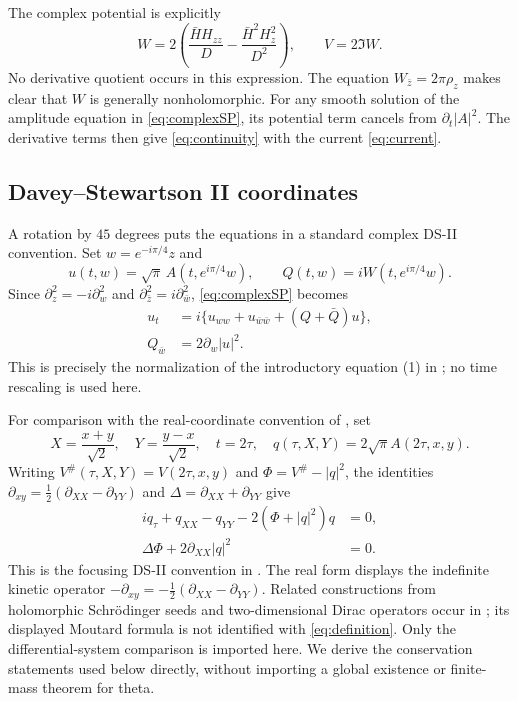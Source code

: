 \documentclass[11pt]{article}
\theoremstyle{definition}
\theoremstyle{remark}
\begin{document}
The complex potential is explicitly
\begin{equation}
 W=2\left(\frac{\bar H H_{zz}}D
             -\frac{\bar H^2H_z^2}{D^2}\right),\qquad
 V=2\Im W.
 \label{eq:explicitV}
\end{equation}
No derivative quotient occurs in this expression. The equation
$W_{\bar z}=2\pi\rho_z$ makes clear that $W$ is generally
nonholomorphic. For any smooth solution of the amplitude equation in
\eqref{eq:complexSP}, its potential term cancels from
$\partial_t|A|^2$. The derivative terms then give
\eqref{eq:continuity} with the current \eqref{eq:current}.

\subsection{Davey--Stewartson II coordinates}

A rotation by $45$ degrees puts the equations in a standard complex
DS-II convention. Set $w=e^{-i\pi/4}z$ and
\[
 u(t,w)=\sqrt\pi\,A(t,e^{i\pi/4}w),\qquad
 Q(t,w)=iW(t,e^{i\pi/4}w).
\]
Since $\partial_z^2=-i\partial_w^2$ and
$\partial_{\bar z}^2=i\partial_{\bar w}^2$,
\eqref{eq:complexSP} becomes
\begin{equation}
 \begin{aligned}
 u_t&=i\{u_{ww}+u_{\bar w\bar w}+(Q+\bar Q)u\},\\
 Q_{\bar w}&=2\partial_w|u|^2.
 \end{aligned}
 \label{eq:complexDSII}
\end{equation}
This is precisely the normalization of the introductory equation (1)
in \cite{Taimanov}; no time rescaling is used here.

For comparison with the real-coordinate convention of \cite{KS}, set
\[
 X=\frac{x+y}{\sqrt2},\quad Y=\frac{y-x}{\sqrt2},\quad t=2\tau,
 \quad q(\tau,X,Y)=2\sqrt\pi A(2\tau,x,y).
\]
Writing $V^\#(\tau,X,Y)=V(2\tau,x,y)$ and
$\Phi=V^\#-|q|^2$, the identities
$\partial_{xy}=\tfrac12(\partial_{XX}-\partial_{YY})$ and
$\Delta=\partial_{XX}+\partial_{YY}$ give
\begin{equation}
 \begin{split}
 iq_\tau+q_{XX}-q_{YY}-2(\Phi+|q|^2)q&=0,\\
 \Delta\Phi+2\partial_{XX}|q|^2&=0.
 \end{split} \label{eq:DSII}
\end{equation}
This is the focusing DS-II convention in \cite[equation (1)]{KS}.
The real form displays the indefinite kinetic operator
$-\partial_{xy}=-\tfrac12(\partial_{XX}-\partial_{YY})$.
Related constructions from holomorphic Schr\"odinger seeds and
two-dimensional Dirac operators occur in \cite{Taimanov}; its displayed
Moutard formula is not identified with \eqref{eq:definition}.
Only the differential-system comparison is imported here. We derive
the conservation statements used below directly, without importing a
global existence or finite-mass theorem for theta.
\end{document}

